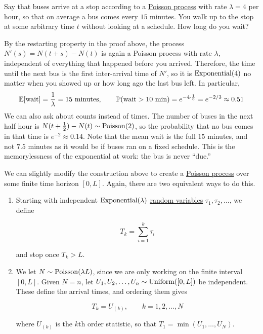 	\begin{example}
	  Say that buses arrive at a stop according to a \hyperref[def:poisson-process]{Poisson process} with rate $\lambda = 4$ per hour, so that on average a bus comes every $15$ minutes. You walk up to the stop at some arbitrary time $t$ without looking at a schedule. How long do you wait? 

	  By the restarting property in the proof above, the process $N'(s) = N(t + s) - N(t)$ is again a Poisson process with rate $\lambda$, independent of everything that happened before you arrived. Therefore, the time until the next bus is the first inter-arrival time of $N'$, so it is $\operatorname{Exponential}(4)$ no matter when you showed up or how long ago the last bus left. In particular, 
	  \begin{equation}
	    \operatorname{\mathbb{E}}[\text{wait}] = \frac{1}{\lambda} = 15 \text{ minutes}, \qquad \mathbb{P}(\text{wait} > 10 \text{ min}) = e^{-4 \cdot \frac{1}{6}} = e^{-2/3} \approx 0.51
	  \end{equation}
	  We can also ask about counts instead of times. The number of buses in the next half hour is $N(t + \tfrac12) - N(t) \sim \operatorname{Poisson}(2)$, so the probability that no bus comes in that time is $e^{-2} \approx 0.14$. Note that the mean wait is the full $15$ minutes, and not $7.5$ minutes as it would be if buses ran on a fixed schedule. This is the memorylessness of the exponential at work: the bus is never ``due.'' 
	\end{example}

	We can slightly modify the construction above to create a \hyperref[def:poisson-process]{Poisson process} over some finite time horizon $[0, L]$. Again, there are two equivalent ways to do this.
	
	\begin{definition}
		\begin{enumerate}
			\item Starting with independent $\operatorname{Exponential}(\lambda)$ \hyperref[prob-def:random-variable]{random variables} $\tau_1, \tau_2, \ldots$, we define

				\begin{equation}
					T_k = \sum_{i=1}^k \tau_i
				\end{equation}

			and stop once $T_k > L$.

			\item We let $N \sim \operatorname{Poisson}(\lambda L)$, since we are only working on the finite interval $[0, L]$. Given $N = n$, let $U_1, U_2, \ldots, U_n \sim \operatorname{Uniform}([0, L])$ be independent. These define the arrival times, and ordering them gives

				\begin{equation}
					T_k = U_{(k)}, \qquad k = 1, 2, \ldots, N
				\end{equation}

			where $U_{(k)}$ is the $k$th order statistic, so that $T_1 = \min(U_1, \ldots, U_N)$.
		\end{enumerate}
	\end{definition}

